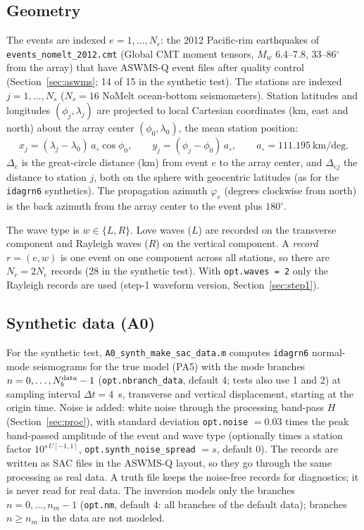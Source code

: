 \documentclass[11pt]{article}
\begin{document}
\subsection{Geometry}
The events are indexed $e=1,\dots,N_e$: the 2012 Pacific-rim earthquakes
of \texttt{events\_nomelt\_2012.cmt} (Global CMT moment tensors, $M_w$
6.4--7.8, 33--86$^\circ$ from the array) that have ASWMS-Q event files
after quality control (Section~\ref{sec:aswms}; 14 of 15 in the synthetic
test). The stations are indexed $j=1,\dots,N_s$ ($N_s=16$
NoMelt ocean-bottom seismometers). Station latitudes and longitudes
$(\phi_j,\lambda_j)$ are projected to local Cartesian coordinates (km,
east and north) about the array center $(\phi_0,\lambda_0)$, the mean
station position:
\begin{equation}
  x_j = (\lambda_j-\lambda_0)\,a_\circ\cos\phi_0,\qquad
  y_j = (\phi_j-\phi_0)\,a_\circ,\qquad a_\circ = 111.195~\text{km/deg}.
\end{equation}
$\Delta_e$ is the great-circle distance (km) from event $e$ to the array
center, and $\Delta_{ej}$ the distance to station $j$, both on the sphere
with geocentric latitudes (as for the \texttt{idagrn6} synthetics). The propagation
azimuth $\varphi_e$ (degrees clockwise from north) is the back azimuth from
the array center to the event plus $180^\circ$.

The wave type is $w\in\{L,R\}$. Love waves ($L$) are recorded on the
transverse component and Rayleigh waves ($R$) on the vertical component. A
\emph{record} $r=(e,w)$ is one event on one component across all stations,
so there are $N_r=2N_e$ records (28 in the synthetic test). With
\texttt{opt.waves = 2} only the Rayleigh records are used (step-1 waveform
version, Section~\ref{sec:step1}).

\subsection{Synthetic data (A0)}\label{sec:synth}
For the synthetic test, \texttt{A0\_synth\_make\_sac\_data.m} computes
\texttt{idagrn6} normal-mode seismograms for the true model (PA5) with the
mode branches $n=0,\dots,N_b^{\rm data}-1$ (\texttt{opt.nbranch\_data},
default 4; tests also use 1 and 2) at sampling interval $\Delta t=4$~s,
transverse and vertical displacement, starting at the origin time. Noise
is added: white noise through the processing band-pass $H$
(Section~\ref{sec:proc}), with standard deviation \texttt{opt.noise} $=0.03$
times the peak band-passed amplitude of the event and wave type (optionally
times a station factor $10^{s\,U[-1,1]}$, \texttt{opt.synth\_noise\_spread}
$=s$, default 0). The records are written as SAC files in the ASWMS-Q
layout, so they go through the same processing as real data. A truth file
keeps the noise-free records for diagnostics; it is never read for real
data. The inversion models only the branches $n=0,\dots,n_m-1$
(\texttt{opt.nm}, default 4: all branches of the default data);
branches $n\ge n_m$ in the data are not modeled.
\end{document}
